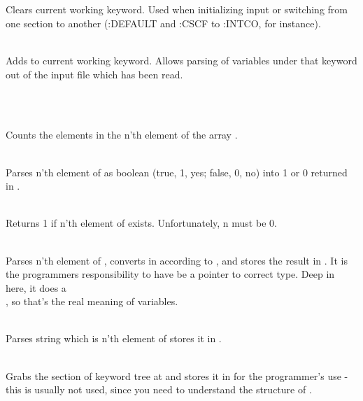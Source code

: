 \begin{center} \\ \end{center}

 \\
Clears current working keyword.  Used when initializing input or switching
from one section to another (:DEFAULT and :CSCF to :INTCO, for instance).

 \\
Adds  to current working keyword.  Allows parsing of 
variables under that keyword out of the input file which has been read.

\begin{center}  \\ \end{center}

 \\
Counts the elements in the n'th element of the array .

 \\
Parses n'th element of  as boolean (true, 1, yes; false, 0, no)
into 1 or 0 returned in .

 \\
Returns 1 if n'th element of  exists.  Unfortunately, n must be 0.

 \\
Parses n'th element of , converts in according to , and
stores the result in .  It is the programmers responsibility to
have  be a pointer to correct type.  Deep in here, it does a \\
, so that's the real meaning of variables.

 \\
Parses string which is n'th element of  stores it in .

 \\
Grabs the section of keyword tree at  and stores it in 
for the programmer's use - this is usually not used, since you need to 
understand the structure of .

